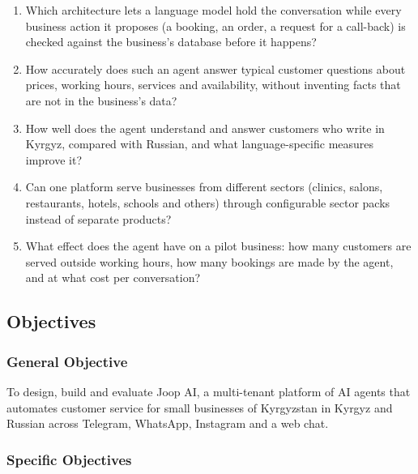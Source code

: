 \begin{enumerate}
	\item[\textbf{RQ1.}] Which architecture lets a language model hold the conversation while every business action it
	proposes (a booking, an order, a request for a call-back) is checked against the business's database before it
	happens?
	\item[\textbf{RQ2.}] How accurately does such an agent answer typical customer questions about prices, working hours,
	services and availability, without inventing facts that are not in the business's data?
	\item[\textbf{RQ3.}] How well does the agent understand and answer customers who write in Kyrgyz, compared with
	Russian, and what language-specific measures improve it?
	\item[\textbf{RQ4.}] Can one platform serve businesses from different sectors (clinics, salons, restaurants, hotels,
	schools and others) through configurable sector packs instead of separate products?
	\item[\textbf{RQ5.}] What effect does the agent have on a pilot business: how many customers are served outside
	working hours, how many bookings are made by the agent, and at what cost per conversation?
\end{enumerate}

\subsection{Objectives}

\subsubsection{General Objective}

To design, build and evaluate Joop AI, a multi-tenant platform of AI agents that automates customer service for small
businesses of Kyrgyzstan in Kyrgyz and Russian across Telegram, WhatsApp, Instagram and a web chat.

\subsubsection{Specific Objectives}

